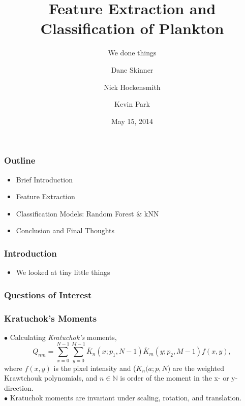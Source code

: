 \documentclass{beamer}
\title 
{Feature Extraction and Classification of Plankton}
\subtitle
{ We done things }
\author{Dane Skinner \and Nick Hockensmith \and Kevin Park}
\institute
{Oregon State University}
\date
{May 15, 2014}
\begin{document}
\begin{frame}
\frametitle{Outline}
	\begin{itemize}
	\item Brief Introduction
	\item Feature Extraction
	\item Classification Models: Random Forest \& kNN 
	\item Conclusion and Final Thoughts
	\end{itemize}
\end{frame}
\begin{frame}
\frametitle{Introduction}
\begin{itemize}
\item We looked at tiny little things
\end{itemize}

\end{frame}


\begin{frame}
\frametitle{Questions of Interest}
\end{frame}


\begin{frame}
\frametitle{Kratuchok's Moments}
$\bullet$ Calculating \textit{Kratuchok's} moments,
\begin{equation*}
Q_{nm} = \sum_{x=0}^{N-1}\sum_{y=0}^{M-1}\bar{K}_n(x;p_1,N-1)\bar{K}_m(y;p_2,M-1)f(x,y),
\end{equation*}
where  $f(x,y)$ is the pixel intensity and ($K_n(a;p,N$) are the weighted Krawtchouk polynomials, and $n\in \mathbb{N}$ is order of the moment in the x- or y-direction.\\
$\bullet$ Kratuchok moments are invariant under scaling, rotation, and translation. \\
\end{frame}


\end{document}
